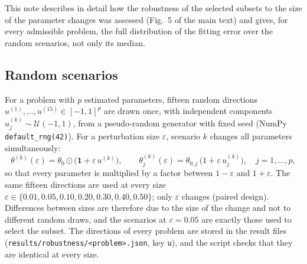 
This note describes in detail how the robustness of the selected subsets to the size of the parameter changes was assessed (Fig.~5 of the main text) and gives, for every admissible problem, the full distribution of the fitting error over the random scenarios, not only its median.

\subsection*{Random scenarios}
For a problem with $p$ estimated parameters, fifteen random directions $u^{(1)},\dots,u^{(15)}\in[-1,1]^p$ are drawn once, with independent components $u^{(k)}_j\sim\mathcal U(-1,1)$, from a pseudo-random generator with fixed seed (NumPy \texttt{default\_rng(42)}). For a perturbation size $\varepsilon$, scenario $k$ changes all parameters simultaneously:
\[ \theta^{(k)}(\varepsilon)=\theta_0\odot\bigl(\mathbf 1+\varepsilon\,u^{(k)}\bigr),\qquad \theta^{(k)}_j(\varepsilon)=\theta_{0,j}\,\bigl(1+\varepsilon\,u^{(k)}_j\bigr),\quad j=1,\dots,p, \]
so that every parameter is multiplied by a factor between $1-\varepsilon$ and $1+\varepsilon$. The same fifteen directions are used at every size $\varepsilon\in\{0.01,0.05,0.10,0.20,0.30,0.40,0.50\}$; only $\varepsilon$ changes (paired design). Differences between sizes are therefore due to the size of the change and not to different random draws, and the scenarios at $\varepsilon=0.05$ are exactly those used to select the subset. The directions of every problem are stored in the result files (\texttt{results/robustness/<problem>.json}, key \texttt{u}), and the script checks that they are identical at every size.

